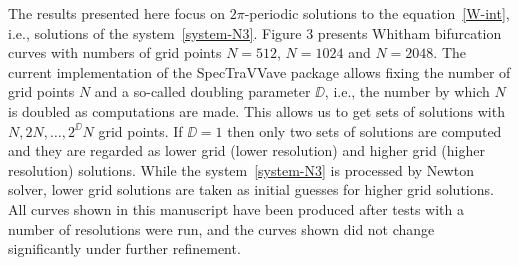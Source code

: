 The results presented here focus on $2\pi$-periodic solutions to the equation~\eqref{W-int}, 
i.e., solutions of the system~\eqref{system-N3}. 
Figure 3 presents Whitham bifurcation curves with numbers of grid points 
$N = 512$, $N=1024$ and $N=2048$. 
The current implementation of the \textsf{SpecTraVVave} package allows fixing the number of grid points $N$ 
and a so-called doubling parameter $\DD$, 
i.e., the number by which $N$ is doubled as computations are made. 	
This allows us to get sets of solutions with $N, 2N, \ldots, 2^{\DD} N$ grid points. 
If $\DD = 1$ then only two sets of solutions are computed and they are regarded as 
lower grid (lower resolution) and higher grid (higher resolution) solutions.
While the system~\eqref{system-N3} is processed by Newton solver, 
lower grid solutions are taken as initial guesses for higher grid solutions. 
All curves shown in this manuscript have been produced
after tests with a number of resolutions were run, 
and the curves shown did not change significantly under further refinement.



